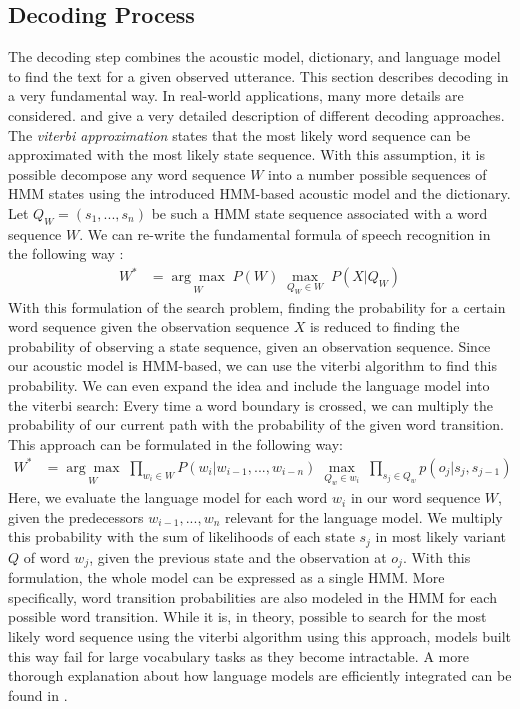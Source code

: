 \subsection{Decoding Process}
\label{sec:asr_decoding}
The decoding step combines the acoustic model, dictionary, and language model to find the text for a given observed utterance. This section describes decoding in a very fundamental way. In real-world applications, many more details are considered. \cite{huang2001spoken} and \cite{yu2016automatic} give a very detailed description of different decoding approaches.\\
The \textit{viterbi approximation} \cite{huang2001spoken} states that the most likely word sequence can be approximated with the most likely state sequence. With this assumption, it is possible decompose any word sequence $W$ into a number possible sequences of HMM states using the introduced HMM-based acoustic model and the dictionary. Let $Q_W = (s_1, ..., s_n)$ be such a HMM state sequence associated with a word sequence $W$. We can re-write the fundamental formula of speech recognition in the following way \cite{demuynck2002doing}: 
\begin{align*}
W^* &= \underset{W}{\arg \max} \; P(W) \; \underset{Q_W \in W}{\max} \; P(X|Q_W)
\end{align*}
With this formulation of the search problem, finding the probability for a certain word sequence given the observation sequence $X$ is reduced to finding the probability of observing a state sequence, given an observation sequence. Since our acoustic model is HMM-based, we can use the viterbi algorithm to find this probability. We can even expand the idea and include the language model into the viterbi search: Every time a word boundary is crossed, we can multiply the probability of our current path with the probability of the given word transition. This approach can be formulated in the following way: 
\begin{align}
W^* &= \underset{W}{\arg \max} \; \prod_{w_i \in W} P(w_i|w_{i - 1},...,w_{i - n}) \; \underset{Q_w \in w_i}{\max} \; \prod_{s_j \in Q_w} p(o_j | s_j, s_{j - 1})
\label{eq:state_based_viterbi_approximation}
\end{align}
Here, we evaluate the language model for each word $w_i$ in our word sequence $W$, given the predecessors $w_{i - 1},...,w_n$ relevant for the language model. We multiply this probability with the sum of likelihoods of each state $s_j$ in most likely variant $Q$ of word $w_j$, given the previous state and the observation at $o_j$. With this formulation, the whole model can be expressed as a single HMM. More specifically, word transition probabilities are also modeled in the HMM for each possible word transition. While it is, in theory, possible to search for the most likely word sequence using the viterbi algorithm using this approach, models built this way fail for large vocabulary tasks as they become intractable. A more thorough explanation about how language models are efficiently integrated can be found in \cite{schukat1995automatische}. \\ 
